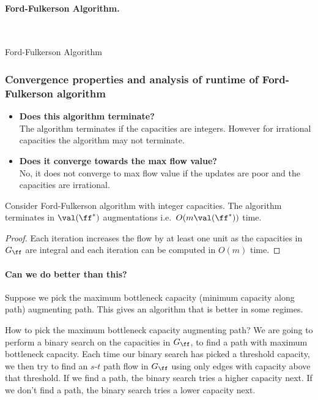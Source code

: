 \paragraph{Ford-Fulkerson Algorithm.}\ \\
\begin{algorithm}[H]
\SetAlgoLined
 \caption{Ford-Fulkerson Algorithm}
\end{algorithm}


\subsubsection{Convergence properties and analysis of runtime of Ford-Fulkerson algorithm}
\begin{itemize}
    \item \textbf{Does this algorithm terminate?}\\
    The algorithm terminates if the capacities are integers. However for irrational capacities the algorithm may not terminate.
    \item \textbf{Does it converge towards the max flow value?}\\
    No, it does not converge to max flow value if the updates are poor and the capacities are irrational.
\end{itemize}

\begin{lemma}
Consider Ford-Fulkerson algorithm with integer capacities. The algorithm terminates in \(\val(\ff^*)\) augmentations i.e.\ $O(m \val(\ff^*))$ time.
\end{lemma}
\begin{proof}
Each iteration increases the flow by at least one unit as the
capacities in \(G_{\ff}\) are integral and each iteration can be
computed in  $O(m)$ time.
\end{proof}

\paragraph{Can we do better than this?}
Suppose we pick the maximum bottleneck capacity (minimum capacity
along path) augmenting path. This gives an algorithm that is better in
some regimes.

How to pick the maximum bottleneck capacity augmenting path? We are
going to perform a binary search on the capacities in \(G_{\ff}\), to
find a path with maximum bottleneck capacity.
Each time our binary search has picked a threshold capacity, we then
try to find an $s$-$t$ path flow in \(G_{\ff}\) using only  edges with
capacity above that threshold. If we find a path, the binary search
tries a higher capacity next. If we don't find a path, the binary search
tries a lower capacity next.

